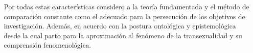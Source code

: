   Por todas estas características considero a la teoría fundamentada y el método
de comparación constante como el adecuado para la persecución de los objetivos
de investigación. Además, en acuerdo con la postura ontológica y
epistemológica desde la cual parto para la aproximación al fenómeno de la
transexualidad y su comprensión fenomenológica.
